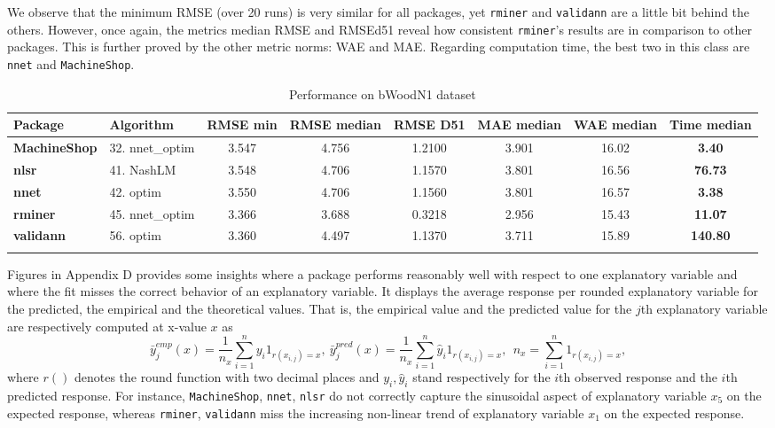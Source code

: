 We observe that the minimum RMSE (over 20 runs) is very similar for all
packages, yet \texttt{rminer} and \texttt{validann} are a little bit
behind the others. However, once again, the metrics median RMSE and
RMSEd51 reveal how consistent \texttt{rminer}'s results are in
comparison to other packages. This is further proved by the other metric
norms: WAE and MAE. Regarding computation time, the best two in this
class are \texttt{nnet} and \texttt{MachineShop}.

\begin{Schunk}
\begin{table}

\caption{\label{tab:unnamed-chunk-5}Performance on bWoodN1 dataset}
\centering
\fontsize{7}{9}\selectfont
\begin{tabular}[t]{>{\bfseries}llccccc>{\bfseries}c}
\toprule
Package & Algorithm & RMSE min & RMSE median & RMSE D51 & MAE median & WAE median & Time median\\
\midrule
MachineShop & 32. nnet\_optim & 3.547 & 4.756 & 1.2100 & 3.901 & 16.02 & 3.40\\
nlsr & 41. NashLM & 3.548 & 4.706 & 1.1570 & 3.801 & 16.56 & 76.73\\
nnet & 42. optim & 3.550 & 4.706 & 1.1560 & 3.801 & 16.57 & 3.38\\
rminer & 45. nnet\_optim & 3.366 & 3.688 & 0.3218 & 2.956 & 15.43 & 11.07\\
validann & 56. optim & 3.360 & 4.497 & 1.1370 & 3.711 & 15.89 & 140.80\\
\bottomrule
\multicolumn{8}{l}{\textit{Note: } statistics taken over 20 runs; time in seconds.}\\
\end{tabular}
\end{table}

\end{Schunk}

Figures in Appendix D provides some insights where a package performs
reasonably well with respect to one explanatory variable and where the
fit misses the correct behavior of an explanatory variable. It displays
the average response per rounded explanatory variable for the predicted,
the empirical and the theoretical values. That is, the empirical value
and the predicted value for the \(j\)th explanatory variable are
respectively computed at x-value \(x\) as \[
\bar y^{emp}_j(x) = \frac1{n_x}  \sum_{i=1}^n y_i 1_{r(x_{i,j}) = x},~
\bar y^{pred}_j(x) =  \frac1{n_x} \sum_{i=1}^n \hat y_i 1_{r(x_{i,j}) = x},~~
n_x=\sum_{i=1}^n 1_{r(x_{i,j}) = x},
\] where \(r()\) denotes the round function with two decimal places and
\(y_i, \hat y_i\) stand respectively for the \(i\)th observed response
and the \(i\)th predicted response. For instance, \texttt{MachineShop},
\texttt{nnet}, \texttt{nlsr} do not correctly capture the sinusoidal
aspect of explanatory variable \(x_5\) on the expected response, whereas
\texttt{rminer}, \texttt{validann} miss the increasing non-linear trend
of explanatory variable \(x_1\) on the expected response.

